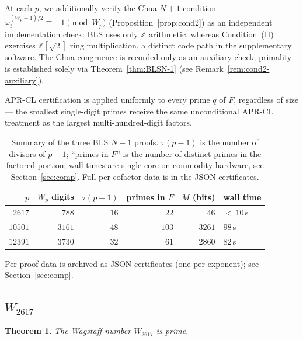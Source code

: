 \documentclass[11pt,a4paper]{amsart}
\theoremstyle{plain}
\newtheorem{theorem}{Theorem}[section]
\theoremstyle{definition}
\newcommand{\Z}{\mathbb{Z}}
\newcommand{\wom}{\omega_3}
\newcommand{\sqrttwo}{\sqrt{2}}
\begin{document}
At each $p$, we additionally verify the Chua $N + 1$ condition
$\wom^{(W_p + 1)/2} \equiv -1 \pmod{W_p}$
(Proposition~\ref{prop:cond2}) as an independent implementation check:
BLS uses only $\Z$ arithmetic, whereas Condition~(II) exercises
$\Z[\sqrttwo]$ ring multiplication, a distinct code path in the
supplementary software. The Chua congruence is recorded only as an
auxiliary check; primality is established solely via
Theorem~\ref{thm:BLSN-1} (see Remark~\ref{rem:cond2-auxiliary}).

APR-CL certification is applied uniformly to every prime $q$ of $F$,
regardless of size --- the smallest single-digit primes receive the
same unconditional APR-CL treatment as the largest multi-hundred-digit
factors.

\begin{table}[h]
\centering
\begin{tabular}{rrrrrl}
\toprule
$p$ & $W_p$ digits & $\tau(p{-}1)$ & primes in $F$ & $M$ (bits) & wall time \\
\midrule
$ 2617$ &  $788$ & $16$ &  $22$ &   $46$ & ${<}\,10$\,s \\
$10501$ & $3161$ & $48$ & $103$ & $3261$ & $98$\,s \\
$12391$ & $3730$ & $32$ & $ 61$ & $2860$ & $82$\,s \\
\bottomrule
\end{tabular}
\caption{Summary of the three BLS $N - 1$ proofs. $\tau(p - 1)$ is
the number of divisors of $p - 1$; ``primes in $F$'' is the number of
distinct primes in the factored portion; wall times are single-core
on commodity hardware, see Section~\ref{sec:comp}. Full per-cofactor
data is in the JSON certificates.}
\label{tab:summary}
\end{table}

Per-proof data is archived as JSON certificates (one per
exponent); see Section~\ref{sec:comp}.

\subsection{$W_{2617}$}
\label{ssec:w2617}

\begin{theorem}
\label{thm:w2617}
The Wagstaff number $W_{2617}$ is prime.
\end{theorem}
\end{document}
